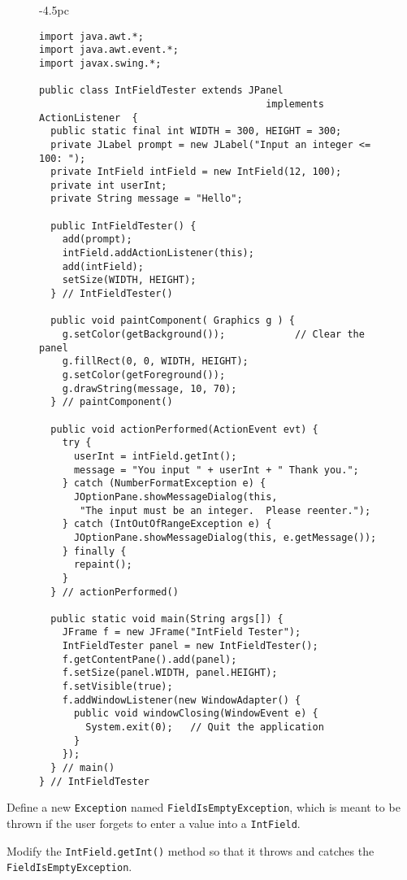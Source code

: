 \begin{figure}[p]
\jjjprogstart
\begin{jjjlistingleft}[30.5pc]{-4.5pc}
\begin{lstlisting}
import java.awt.*;
import java.awt.event.*;
import javax.swing.*;

public class IntFieldTester extends JPanel 
                                       implements ActionListener  {
  public static final int WIDTH = 300, HEIGHT = 300;
  private JLabel prompt = new JLabel("Input an integer <= 100: ");
  private IntField intField = new IntField(12, 100);
  private int userInt;
  private String message = "Hello";

  public IntFieldTester() {
    add(prompt);
    intField.addActionListener(this);
    add(intField);
    setSize(WIDTH, HEIGHT);
  } // IntFieldTester()

  public void paintComponent( Graphics g ) {
    g.setColor(getBackground());            // Clear the panel
    g.fillRect(0, 0, WIDTH, HEIGHT);
    g.setColor(getForeground());
    g.drawString(message, 10, 70);
  } // paintComponent()

  public void actionPerformed(ActionEvent evt) {
    try {
      userInt = intField.getInt();
      message = "You input " + userInt + " Thank you.";
    } catch (NumberFormatException e) {
      JOptionPane.showMessageDialog(this,
       "The input must be an integer.  Please reenter.");
    } catch (IntOutOfRangeException e) {
      JOptionPane.showMessageDialog(this, e.getMessage());
    } finally {
      repaint();
    }
  } // actionPerformed()

  public static void main(String args[]) {
    JFrame f = new JFrame("IntField Tester");
    IntFieldTester panel = new IntFieldTester();
    f.getContentPane().add(panel);
    f.setSize(panel.WIDTH, panel.HEIGHT);
    f.setVisible(true);
    f.addWindowListener(new WindowAdapter() { 
      public void windowClosing(WindowEvent e) {
        System.exit(0);   // Quit the application
      }
    });
  } // main()
} // IntFieldTester
\end{lstlisting}
\end{jjjlistingleft}
\end{figure}

\begin{SSTUDY}

\item  Define a new {\tt Exception} named {\tt FieldIsEmpty\-Exception},
which is meant to be thrown if the user forgets to enter
a value into a {\tt IntField}.


\item  Modify the {\tt IntField.getInt()} method so that it throws and catches
the {\tt FieldIsEmptyException}.

\end{SSTUDY}

